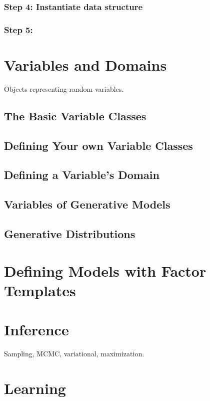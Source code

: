 \documentclass[]{manual}
\begin{document}
\subsection{Step 4: Instantiate data structure}

\subsection{Step 5: }

\chapter{Variables and Domains}
\label{chap:variables}

Objects representing random variables.

\section{The Basic Variable Classes}
\section{Defining Your own Variable Classes}
\section{Defining a Variable's Domain}
\section{Variables of Generative Models}
\section{Generative Distributions}


\chapter{Defining Models with Factor Templates}
\label{chap:models}


\chapter{Inference}
\label{chap:inference}

Sampling, MCMC, variational, maximization.


\chapter{Learning}
\label{chap:learning}
\end{document}
